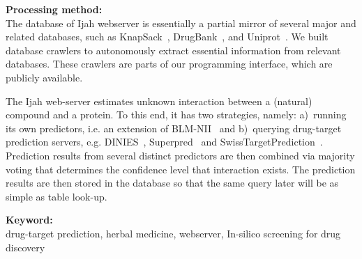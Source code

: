 \noindent
\textbf{Processing method:}\\
The database of Ijah webserver is essentially a partial mirror of
several major and related databases, such as KnapSack~\cite{pmid23292603}, DrugBank~\cite{pmid21059682}, and Uniprot~\cite{pmid25348405}.
We built database crawlers to autonomously extract essential information from relevant databases.
These crawlers are parts of our programming interface, which are publicly available.

The Ijah web-server estimates unknown interaction between a (natural) compound and a protein.
To this end, it has two strategies, namely:
a)~running its own predictors, i.e. an extension of BLM-NII~\cite{mei} and
b)~querying drug-target prediction servers, e.g. DINIES~\cite{YamanishiKMSKG14}, Superpred~\cite{NickelGEBRGDP14} and SwissTargetPrediction~\cite{GfellerGWDMZ14}.
Prediction results from several distinct predictors are then combined via
majority voting that determines the confidence level that interaction exists.
The prediction results are then stored in the database so that the same query later
will be as simple as table look-up.

\noindent
\textbf{Keyword:}\\
 drug-target prediction, herbal medicine, webserver, In-silico screening for drug discovery

{\footnotesize

}
